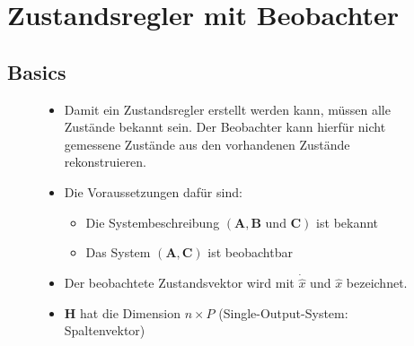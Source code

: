 \section{Zustandsregler mit Beobachter}
\subsection{Basics}
\begin{figure}[!h]
	\normalsize
	\begin{minipage}{.45\linewidth}
		\begin{itemize}
			\item Damit ein Zustandsregler erstellt werden kann, müssen alle Zustände bekannt sein. Der Beobachter kann hierfür nicht gemessene Zustände aus den vorhandenen Zustände rekonstruieren.
			\item Die Voraussetzungen dafür sind:
			\begin{itemize}
				\item Die Systembeschreibung $\left( \boldsymbol{A}, \boldsymbol{B} \text{ und } \boldsymbol{C}\right)$ ist bekannt
				\item Das System $\left( \boldsymbol{A}, \boldsymbol{C}\right)$ ist beobachtbar
			\end{itemize}
			\item Der beobachtete Zustandsvektor wird mit $\dot{\hat{x}}$ und $\hat{x}$ bezeichnet.
			\item $\boldsymbol{H}$ hat die Dimension $n \times P$ (Single-Output-System: Spaltenvektor)
		\end{itemize}
	\end{minipage}
	\begin{minipage}{.45\linewidth}
		\centering
		\normalsize
	\end{minipage}%
	\hfill
\end{figure}

